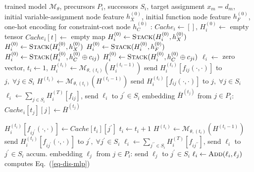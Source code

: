 \documentclass[letterpaper]{article} %
\begin{document}
\algrenewcommand{}
\begin{algorithm}[!t]
\small
\caption{Distributed embedding schema for agent $i$}\label{algo:train_d}
\begin{algorithmic}[1]
\Require trained model $\mathcal{M}_\theta$, precursors $P_i$, successors $S_i$, target assignment $x_m=d_m$, initial variable-assignment node feature $h_X^{(0)}$, initial function node feature $h_F^{(0)}$, one-hot encoding for constraint-cost node $h_C^{(0)}$
:
\State $Cache_i\gets []$, $H_i^{(0)}\gets $ empty tensor
$Cache_i[t]\gets $ empty map
\EndFor
{}
$H_i^{(0)}\gets \textsc{Stack}(H_i^{(0)},h_X^{(0)})$
\Else
{}
$H_i^{(0)}\gets \textsc{Stack}(H_i^{(0)},h_X^{(0)})$
\EndFor
\EndIf
{}
\State $H_i^{(0)}\gets \textsc{Stack}(H_i^{(0)},h_F^{(0)})$
\State $H_i^{(0)}\gets \textsc{Stack}(H_i^{(0)},h_C^{(0)}\oplus c_{ij})$
\EndFor
\EndFor
{}
\State $H_i^{(0)}\gets \textsc{Stack}(H_i^{(0)},h_C^{(0)}\oplus c_{ji})$
\EndFor
\EndFor
\State $\ell_i\gets $ zero vector, $t_i\gets 1$, $H_i^{(t_i)}\gets \mathcal{M}_{\theta, (t_i)}(H_i^{(t_i-1)})$
\State send $H^{(t_i)}_{i}[f_{ij}(\cdot,\cdot)]$ to $j,\; \forall j\in S_i$
\State $H^{(t_i)}\gets \mathcal{M}_{\theta, (t_i)}(H^{(t_i-1)})$
\State send $H^{(t_i)}_{i}[f_{ij}(\cdot,\cdot)]$ to $j,\; \forall j\in S_i$
\EndIf
\EndFor
\State $\ell_i\gets\sum_{j\in S_i}H^{(T)}_i[f_{ij}]$, send $\ell_i$ to $j^\prime\in S_i$
\EndIf
\EndProcedure
{} embedding $\bar{H}^{(t_j)}$ from $j\in P_i$:
\State $Cache_i[t_j][j]\gets \bar{H}^{(t_j)}$

\State $H_{i}^{(t_i)}[f_{ij^\prime}(\cdot,\cdot)]\gets Cache[t_i][{j^\prime}]$ 
\EndFor
\State $t_i\gets t_i+1$
\State $H^{(t_i)}\gets \mathcal{M}_{\theta, (t_i)}(H^{(t_i-1)})$
\State send $H^{(t_i)}_{i}[f_{ij^\prime}(\cdot,\cdot)]$ to $j^\prime,\; \forall j^\prime\in S_i$
\Else
\State $\ell_i\gets\sum_{j^{\prime\prime}\in S_i}H^{(T)}_i[f_{ij^{\prime\prime}}]$, send $\ell_i$ to $j^\prime\in S_i$
\EndIf
\EndIf
\EndProcedure
{} accum. embedding $\ell_j$ from $j\in P_i$:
\State send $\ell_j$ to ${j^\prime}\in S_i$
\Else 
\State $\ell_i\gets \textsc{Add}(\ell_i,\ell_j)$
\State computes Eq.~(\ref{eq-dis-mlp})
\EndIf
\EndIf
\EndProcedure
\end{algorithmic}
\end{algorithm}
\end{document}
